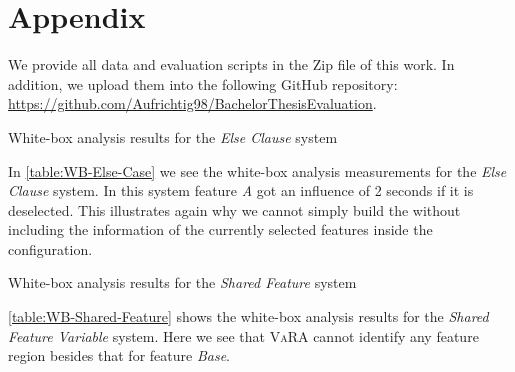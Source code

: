 \chapter{Appendix}\label{ch:appendix}

We provide all data and evaluation scripts in the Zip file of this work. In addition, we upload them into the following GitHub
repository: \url{https://github.com/Aufrichtig98/BachelorThesisEvaluation}.

\begin{table}[H]
    \centering
    
    \caption{White-box analysis results for the \emph{Else Clause} system}\label{table:WB-Else-Case}
 \end{table}

 In \autoref{table:WB-Else-Case} we see the white-box analysis measurements for the \emph{Else Clause} system.
 In this system feature \emph{A} got an influence of 2 seconds if it is deselected.
 This illustrates again why we cannot simply build the {\perfInfluenceModel} without including the information of the currently selected features
 inside the configuration. 

 \begin{table}[H]
    \centering
    
    \caption{White-box analysis results for the \emph{Shared Feature} system}\label{table:WB-Shared-Feature}
 \end{table}

 \autoref{table:WB-Shared-Feature} shows the white-box analysis results for the \emph{Shared Feature Variable} system.
 Here we see that \textsc{VaRA} cannot identify any feature region besides that for feature \emph{Base}.


